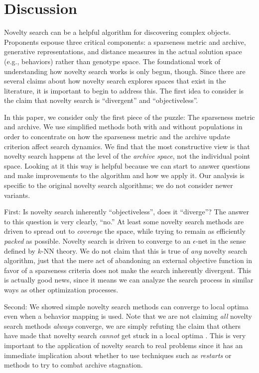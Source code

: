 \documentclass[twoside]{article}
\begin{document}
\section{Discussion}
\label{sec:discussion}

Novelty search can be a helpful algorithm for discovering complex objects.  Proponents espouse three critical components:  a sparseness metric and archive, generative representations, and distance measures in the actual solution space (e.g., behaviors) rather than genotype space.  The foundational work of understanding how novelty search works is only begun, though.  Since there are several claims about how novelty search explores spaces that exist in the literature, it is important to begin to address this.  The first idea to consider is the claim that novelty search is ``divergent'' and ``objectiveless''.  

In this paper, we consider only the first piece of the puzzle:  The sparseness metric and archive.  We use simplified methods both with and without populations in order to concentrate on how the sparseness metric and the archive update criterion affect search dynamics.  We find that the most constructive view is that novelty search happens at the level of the \emph{archive space}, not the individual point space.  Looking at it this way is helpful because we can start to answer questions and make improvements to the algorithm and how we apply it.  Our analysis is specific to the original novelty search algorithms; we do not consider newer variants.

First:  Is novelty search inherently ``objectiveless'', does it ``diverge''?  The answer to this question is very clearly, ``no.''   At least some novelty search methods are driven to spread out to \emph{coverage} the space, while trying to remain as efficiently \emph{packed} as possible.  Novelty search is driven to converge to an $\epsilon$-net in the sense defined by $k$-NN theory.  We do not claim that this is true of \emph{any} novelty search algorithm, just that the mere act of abandoning an external objective function in favor of a sparseness criteria does not make the search inherently divergent.  This is actually good news, since it means we can analyze the search process in similar ways as other optimization processes. 

Second: We showed simple novelty search methods can converge to local optima even when a behavior mapping is used.  Note that we are not claiming \emph{all} novelty search methods \emph{always} converge, we are simply refuting the claim that others have made that novelty search \emph{cannot} get stuck in a local optima \citep{Lehman2016frai,Lehman2015gecco,StanleyLehman2015}.  This is very important to the application of novelty search to real problems since it has an immediate implication about whether to use techniques such as \emph{restarts} or methods to try to combat archive stagnation.
\end{document}
